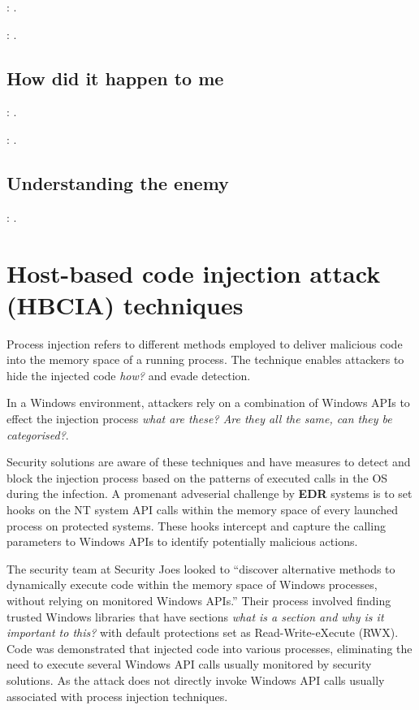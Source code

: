\documentclass{article}
\begin{document}
\textbf{}: \textcite{FBI:2023}.

\textbf{}: \textcite{Hiscox:2022}.


\subsection{How did it happen to me}

\textbf{}: \textcite{CVE-2023-3467}.

\textbf{}: \textcite{CVE-2023-3519}.


\subsection{Understanding the enemy}

\textbf{}: \textcite{CISA:2023}.

\section{Host-based code injection attack (HBCIA) techniques}

Process injection refers to different methods employed to deliver malicious code into the memory space of a
running process.  The technique enables attackers to hide the injected code \textit{how?} and evade detection.

In a Windows \faWindows \space environment, attackers rely on a combination of Windows APIs to effect the injection
process \textit{what are these? Are they all the same, can they be categorised?}.

Security solutions are aware of these techniques and have measures to detect and block the injection process based
on the patterns of executed calls in the OS during the infection.  A promenant adveserial challenge by \textbf{EDR}
systems is to set hooks on the NT system API calls within the memory space of every launched process on protected
systems.  These hooks intercept and capture the calling parameters to Windows APIs to identify potentially malicious actions.

The security team at Security Joes looked to ``discover alternative methods to dynamically execute code within
the memory space of Windows processes, without relying on monitored Windows APIs.''  Their process involved
finding trusted Windows libraries that have sections \textit{what is a section and why is it important to this?}
with default protections set as Read-Write-eXecute (RWX).  Code was demonstrated that injected code into various
processes, eliminating the need to execute several Windows API calls usually monitored by security solutions.
As the attack does not directly invoke Windows API calls usually associated with process injection techniques.
\end{document}
